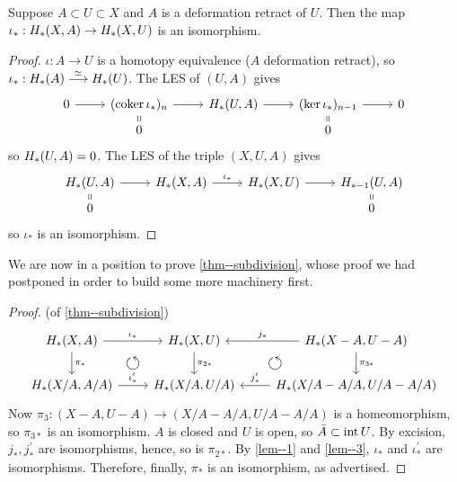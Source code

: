 \documentclass[a4paper,11pt]{article}
\begin{document}
				\begin{lemma}\label{lem--3}
					Suppose $A\subset U\subset X$ and $A$ is a deformation retract of $U$. Then the map $\iota_\ast:H_{\ast}(X,A)\rightarrow H_{\ast}(X,U)$ is an isomorphism.
				\end{lemma}
				\begin{proof}
					$\iota:A\rightarrow U$ is a homotopy equivalence ($A$ deformation retract), so $\iota_\ast:H_{\ast}(A)\overset{\simeq}{\longrightarrow}H_{\ast}(U)$. The LES of $(U,A)$ gives
					\begin{equation*}
						\begin{tikzcd}[row sep=tiny]
							0\ar[r]& (\coker\iota_\ast)_n\ar[d,equal]\ar[r]& \hg{U,A}\ar[r]& (\ker\iota_\ast)_{n-1}\ar[d,equal]\ar[r]& 0\\
							& 0 & & 0 &
						\end{tikzcd}
					\end{equation*}
					so $H_{\ast}(U,A)=0$. The LES of the triple $(X,U,A)$ gives 
					\begin{equation*}
						\begin{tikzcd}[row sep=tiny]
							\hg{U,A}\ar[d,equal]\ar[r]& \hg{X,A}\ar[r,"\iota_\ast"]& \hg{X,U}\ar[r]& \hg[\ast-1]{U,A}\ar[d,equal]\\
							0 & & & 0
						\end{tikzcd}
					\end{equation*}
					so $\iota_\ast$ is an isomorphism.
				\end{proof}

				We are now in a position to prove \autoref{thm--subdivision}, whose proof we had postponed in order to build some more machinery first.

				\begin{proof}(of \autoref{thm--subdivision})
					\begin{equation*}
						\begin{tikzcd}
							\hg{X,A}\ar[d,"\pi_\ast"]\ar[r,"\iota_\ast"]& \hg{X,U}\ar[d,"\pi_{2\ast}"]& \hg{X- A,U- A}\ar[d,"\pi_{3\ast}"]\ar[l,"j_\ast"']\\
							\hg{X/A,A/A}\arrow[ur, phantom, "\scalebox{1.5}{$\circlearrowleft$}" description]\ar[r,"\iota_\ast^{\prime}"]& \hg{X/A,U/A}\arrow[ur, phantom, "\scalebox{1.5}{$\circlearrowleft$}" description]& \hg{X/A-A/A,U/A-A/A}\ar[l,"j_\ast^{\prime}"']
						\end{tikzcd}
					\end{equation*}
					Now $\pi_{3}:(X-A,U-A)\rightarrow (X/A-A/A,U/A-A/A)$ is a homeomorphism, so $\pi_{3\ast}$ is an isomorphism. $A$ is closed and $U$ is open, so $\bar{A}\subset\operatorname{int} U$. By excision, $j_\ast,j_\ast^{\prime}$ are isomorphisms, hence, so is $\pi_{2\ast}$. By \autoref{lem--1} and \ref{lem--3}, $\iota_\ast$ and $\iota_\ast^\prime$ are isomorphisms. Therefore, finally, $\pi_\ast$ is an isomorphism, as advertised.
				\end{proof}
\end{document}
